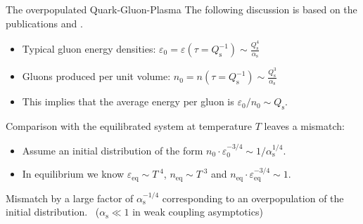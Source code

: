 \begin{frame}{The overpopulated Quark-Gluon-Plasma}
The following discussion is based on the publications \cite{Blaizot2012} and \cite{Blaizot2016}.\\[0.5em]
\begin{itemize}
	\item Typical gluon energy densities: $\varepsilon_0 = \varepsilon(\tau=Q_{\mathrm{s}}^{-1})\sim \frac{Q_{\mathrm{s}}^{4}}{\alpha_{\mathrm{s}}}$
	\item Gluons produced per unit volume: $n_0 = n(\tau=Q_{\mathrm{s}}^{-1})\sim \frac{Q_{\mathrm{s}}^{3}}{\alpha_{\mathrm{s}}}$
	\item This implies that the average energy per gluon is $\varepsilon_0/n_0 \sim Q_{\mathrm{s}}$.	
\end{itemize}
\vspace{0.5em}
Comparison with the equilibrated system at temperature $T$ leaves a mismatch:\\[0.5em]
\begin{itemize}
	\item Assume an initial distribution of the form $n_0\cdot\varepsilon_0^{-3/4}\sim 1/\alpha_{\mathrm{s}}^{1/4}$.
	\item In equilibrium we know $\varepsilon_{\mathrm{eq}} \sim T^{\phantom{.}4}$, $n_{\mathrm{eq}} \sim T^{\phantom{.}3}$ and $n_{\mathrm{eq}}\cdot\varepsilon_{\mathrm{eq}}^{-3/4}\sim 1$.
\end{itemize}
\vspace{0.5em}
Mismatch by a \alert{large} factor of $\alpha_{\mathrm{s}}^{-1/4}$ corresponding to an \alert{overpopulation} of the initial distribution. \ ($\alpha_{\mathrm{s}} \ll 1 $ in weak coupling asymptotics)
\end{frame}


